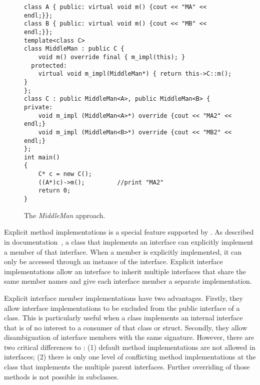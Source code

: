 \begin{figure*}[t]
\saveSpaceFig
\begin{lstlisting}
class A { public: virtual void m() {cout << "MA" << endl;}};
class B { public: virtual void m() {cout << "MB" << endl;}};
template<class C>
class MiddleMan : public C {
    void m() override final { m_impl(this); }
  protected:
    virtual void m_impl(MiddleMan*) { return this->C::m(); }
};
class C : public MiddleMan<A>, public MiddleMan<B> { 
private:
    void m_impl (MiddleMan<A>*) override {cout << "MA2" << endl;}
    void m_impl (MiddleMan<B>*) override {cout << "MB2" << endl;}
};
int main()
{
    C* c = new C();
    ((A*)c)->m();         //print "MA2"
    return 0;
}
\end{lstlisting}
\caption{The \emph{MiddleMan} approach.}
\label{fig:middleman}
\saveSpaceFig
\end{figure*}

Explicit method implementations is a special feature supported by
\csharp{}. As described in \csharp{} documentation~\cite{csharpdoc}, a
class that implements an interface can explicitly implement a member
of that interface. When a member is explicitly implemented, it can
only be accessed through an instance of the interface. Explicit
interface implementations allow an interface to inherit multiple 
interfaces that share the same member names and give each interface
member a separate implementation. 

Explicit interface member implementations have two advantages.
Firstly, they allow interface implementations to be excluded 
from the public interface of a class. This is particularly useful when a class implements an internal 
interface that is of no interest to a consumer of that class or struct.
Secondly, they allow disambiguation of interface members with the 
same signature. However, there are two critical differences to \MIM{}:
(1) default method implementations are not allowed in \csharp{} interfaces; 
(2) there is only one level of conflicting method implementations at the
class that implements the multiple parent interfaces. Further
overriding of those methods is not possible in subclasses.

